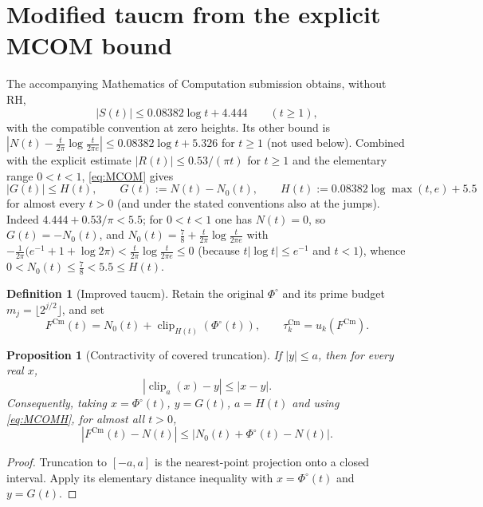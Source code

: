 \documentclass[11pt,a4paper]{article}
\numberwithin{equation}{section}
\newtheorem{proposition}[theorem]{Proposition}
\theoremstyle{definition}
\newtheorem{definition}[theorem]{Definition}
\theoremstyle{remark}
\newcommand{\clip}{\operatorname{clip}}
\newcommand{\Cm}{\mathrm{Cm}}
\begin{document}
\section{Modified taucm from the explicit MCOM bound}\label{sec:taucm}
The accompanying Mathematics of Computation submission \cite{CasanaMCOM} obtains, without RH,
\begin{equation}\label{eq:MCOM}
|S(t)|\le0.08382\log t+4.444\qquad(t\ge1),
\end{equation}
with the compatible convention at zero heights. Its other bound is
$|N(t)-\frac{t}{2\pi}\log\frac{t}{2\pi e}|\le0.08382\log t+5.326$ for $t\ge1$ (not used below).
Combined with the explicit estimate $|R(t)|\le0.53/(\pi t)$ for $t\ge1$ and the elementary range $0<t<1$, \eqref{eq:MCOM} gives
\begin{equation}\label{eq:MCOMH}
|G(t)|\le H(t),\qquad
G(t):=N(t)-N_0(t),\qquad
H(t):=0.08382\log\max(t,e)+5.5
\end{equation}
for almost every $t>0$ (and under the stated conventions also at the jumps). Indeed $4.444+0.53/\pi<5.5$; for $0<t<1$ one has $N(t)=0$, so $G(t)=-N_0(t)$, and $N_0(t)=\frac7{8}+\frac{t}{2\pi}\log\frac t{2\pi e}$ with $-\frac{1}{2\pi}\bigl(e^{-1}+1+\log2\pi\bigr)<\frac t{2\pi}\log\frac t{2\pi e}\le0$ (because $t|\log t|\le e^{-1}$ and $t<1$), whence $0<N_0(t)\le\frac78<5.5\le H(t)$.

\begin{definition}[Improved taucm]\label{def:taucm}
Retain the original $\Phi^\circ$ and its prime budget $m_j=\lfloor2^{j/2}\rfloor$, and set
\begin{equation}\label{eq:taucm}
F^{\Cm}(t)=N_0(t)+\clip_{H(t)}(\Phi^\circ(t)),\qquad
\tau_k^{\Cm}=u_k(F^{\Cm}).
\end{equation}
\end{definition}

\begin{proposition}[Contractivity of covered truncation]\label{prop:contract}
If $|y|\le a$, then for every real $x$,
\begin{equation}\label{eq:contract}
|\clip_a(x)-y|\le|x-y|.
\end{equation}
Consequently, taking $x=\Phi^\circ(t)$, $y=G(t)$, $a=H(t)$ and using \eqref{eq:MCOMH}, for almost all $t>0$,
\begin{equation}\label{eq:contract-F}
|F^{\Cm}(t)-N(t)|\le|N_0(t)+\Phi^\circ(t)-N(t)|.
\end{equation}
\end{proposition}
\begin{proof}
Truncation to $[-a,a]$ is the nearest-point projection onto a closed interval. Apply its elementary distance inequality with $x=\Phi^\circ(t)$ and $y=G(t)$.
\end{proof}
\end{document}
